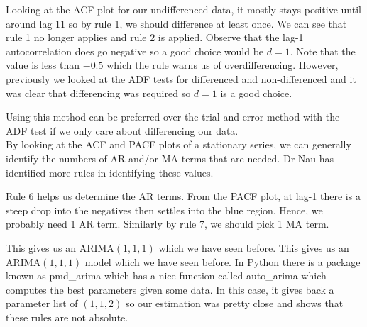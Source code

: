 \documentclass{article}
\begin{document}
  Looking at the ACF plot for our undifferenced data, it mostly stays positive until around lag 11 so by rule 1, we should difference at least once. We can see that rule 1 no longer applies and rule 2 is applied. Observe that the lag-1 autocorrelation does go negative so a good choice would be $d=1$. Note that the value is less than $-0.5$ which the rule warns us of overdifferencing. However, previously we looked at the ADF tests for differenced and non-differenced and it was clear that differencing was required so $d=1$ is a good choice.

  Using this method can be preferred over the trial and error method with the ADF test if we only care about differencing our data.\\
  By looking at the ACF and PACF plots of a stationary series, we can generally identify the numbers of AR and/or MA terms that are needed. Dr Nau has identified more rules in identifying these values.
  \newline
  \newline
  \emph{\\
  }
  \newline

  Rule 6 helps us determine the AR terms. From the PACF plot, at lag-1 there is a steep drop into the negatives then settles into the blue region. Hence, we probably need 1 AR term. Similarly by rule 7, we should pick 1 MA term.

  This gives us an ARIMA$(1,1,1)$ which we have seen before. This gives us an ARIMA$(1,1,1)$ model which we have seen before. In Python there is a package known as pmd\_arima which has a nice function called auto\_arima which computes the best parameters given some data. In this case, it gives back a parameter list of $(1,1,2)$ so our estimation was pretty close and shows that these rules are not absolute.
  
\end{document}
